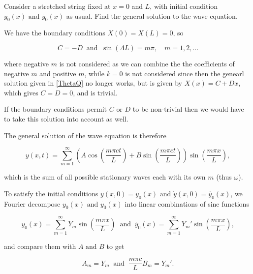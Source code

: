 \documentclass[a4paper,12pt]{report}
\begin{document}
{Consider a stretched string fixed at \(x=0\) and \(L\), with initial condition \(y_0 (x) \text { and }  \dot{y_0 }(x) \) as usual. Find the general solution to the wave equation. }
{We have the boundary conditions \(X(0) = X(L) = 0\), so

\begin{equation}
	C = - D ~\text { and }~ \sin (\Lambda L) = m \pi , \quad m = 1,2,\ldots 
\end{equation}

where negative \(m\) is not considered as we can combine the the coefficients of negative \(m\) and positive \(m\), while \(k = 0\) is not considered since then the genearl solution given in \cref{ThetaQ} no longer works, but is given by \(X(x) = C + Dx\), which gives \(C = D = 0\), and is trivial.

If the boundary conditions permit \(C \text { or } D\) to be non-trivial then we would have to take this solution into account as well. 

The general solution of the wave equation is therefore

\begin{equation}
	y(x,t) = \sum_{m=1}^{\infty}\left( A\cos \left( \frac{m \pi ct}{L}  \right) + B  \sin \left( \frac{m \pi ct}{L}  \right)  \right) \sin \left( \frac{m \pi x}{L}  \right),
\end{equation}

which is the sum of all possible stationary waves each with its own \(m\) (thus \(\omega \)).

To satisfy the initial conditions \(y(x,0) = y_0 (x) \text { and } \dot{y}(x,0) = \dot{y_0 }(x)  \), we Fourier decompose \(y_0 (x) \text { and } \dot{y_0 }(x) \) into linear combinations of sine functions 

\begin{equation}
	y_0 (x) = \sum_{m=1}^{\infty} Y_{m}\sin \left( \frac{m\pi x}{L}  \right) ~\text { and }~ \dot{y_0 }(x) = \sum_{m=1}^{\infty} Y_{m}' \sin \left( \frac{m \pi x}{L}  \right),   
\end{equation}

and compare them with \(A \text { and } B \) to get

\begin{equation}
	A_{m} = Y_{m} ~\text { and }~ \frac{m\pi c}{L} B_{m} = Y_{m}'.
\end{equation}}
\end{document}
